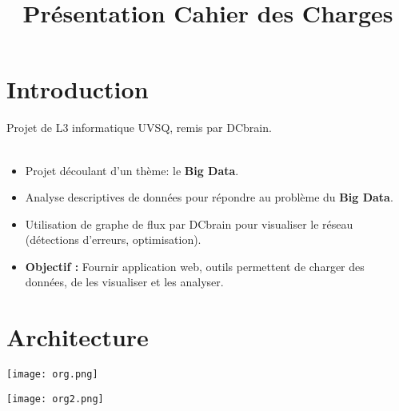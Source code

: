 
\usepackage{../tex/myInfolines}
\usepackage{longtable,array}
\title{Présentation Cahier des Charges}



	\begin{frame}
		\titlepage
	\end{frame}
	
	\section*{Introduction}
		\begin{frame}
			Projet de L3 informatique UVSQ, remis par DCbrain.\\~\\
		\begin{itemize}
		\item Projet découlant d'un thème: le \textbf{Big Data}.\vspace{0.4cm}
		\item Analyse descriptives de données pour répondre au problème du \textbf{Big Data}.\vspace{0.4cm}
		\item Utilisation de graphe de flux par DCbrain pour visualiser le réseau (détections d'erreurs, optimisation).\vspace{0.4cm}
		\item \textbf{Objectif :} Fournir application web, outils permettent de charger des données, de les visualiser et les analyser.
		\end{itemize}
		\end{frame}
	
	\section{Architecture}
	\begin{frame}
		\begin{center}\texttt{[image: org.png]}\end{center}
	\end{frame}		
	
	\begin{frame}
		\begin{center}\texttt{[image: org2.png]}\end{center}
	\end{frame}
	
